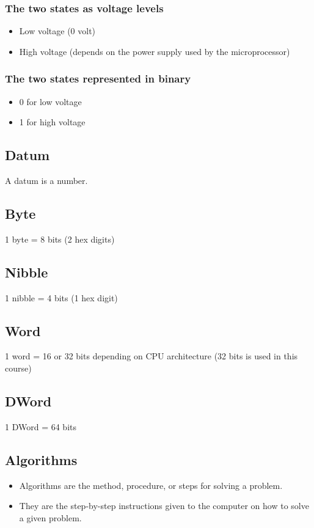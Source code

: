 \documentclass[11pt]{article}
\begin{document}
\subsubsection{The two states as voltage levels}
\label{sec:org3d27043}
\begin{itemize}
\item Low voltage (0 volt)
\item High voltage (depends on the power supply used by the microprocessor)
\end{itemize}

\subsubsection{The two states represented in binary}
\label{sec:org655a4dc}
\begin{itemize}
\item 0 for low voltage
\item 1 for high voltage
\end{itemize}

\subsection{Datum}
\label{sec:org00b6e0e}
A datum is a number.

\subsection{Byte}
\label{sec:org29308c1}
1 byte = 8 bits (2 hex digits)

\subsection{Nibble}
\label{sec:org3254b8c}
1 nibble = 4 bits (1 hex digit)

\subsection{Word}
\label{sec:org398b454}
1 word = 16 or 32 bits depending on CPU architecture (32 bits is used in this course)

\subsection{DWord}
\label{sec:org98da38f}
1 DWord = 64 bits

\subsection{Algorithms}
\label{sec:orgf3ef1e1}
\begin{itemize}
\item Algorithms are the method, procedure, or steps for solving a problem.
\item They are the step-by-step instructions given to the computer on how to solve a given problem.
\end{itemize}
\end{document}

